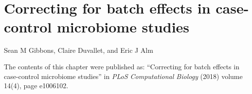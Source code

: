 

\chapter{Correcting for batch effects in case-control microbiome studies}

\noindent
Sean M Gibbons, Claire Duvallet, and Eric J Alm

\bigskip
\bigskip
\noindent
The contents of this chapter were published as: ``Correcting for batch effects in case-control microbiome studies'' in \textit{PLoS Computational Biology} (2018) volume 14(4), page e1006102.

\clearpage
%
